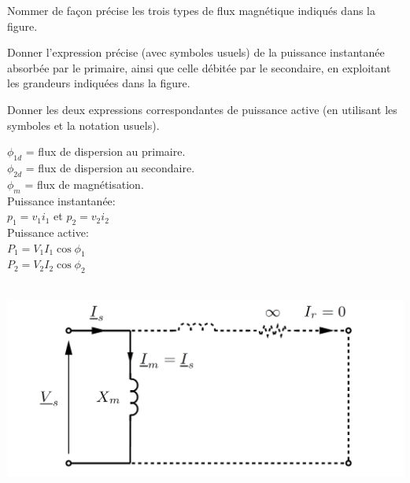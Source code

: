 \begin{questions}
{Nommer de façon précise les trois types de flux magnétique indiqués dans la figure.

Donner l'expression précise (avec symboles usuels) de la puissance instantanée absorbée par le primaire, ainsi que celle débitée par le secondaire, en exploitant les grandeurs indiquées dans la figure.

Donner les deux expressions correspondantes de puissance active (en utilisant les symboles et la notation usuels).
}
\begin{solution}
$\phi_{1d}$ = flux de dispersion au primaire.\\
$\phi_{2d}$ = flux de dispersion au secondaire.\\
$\phi_{m}$ = flux de magnétisation.\\

Puissance instantanée:\\
$p_1 = v_1 i_1$ et $p_2 = v_2 i_2$\\
Puissance active:\\
$P_1= V_1 I_1 \cos \phi_1$\\
$P_2= V_2 I_2 \cos \phi_2$\\
\end{solution}

\begin{solution}\\
\includegraphics[width= 0.7 \textwidth]{./img/schema_simpl}


\end{solution}
\end{questions}
